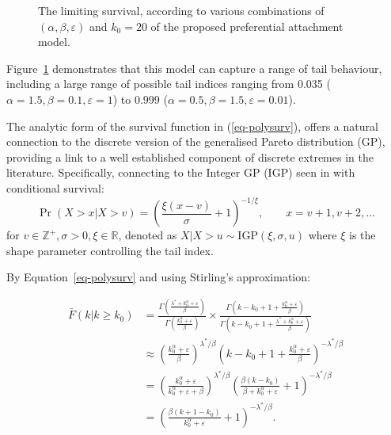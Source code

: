 \documentclass[
  sn-basic,
]{sn-jnl}
\theoremstyle{plain}
\theoremstyle{plain}
\theoremstyle{remark}
\begin{document}
\begin{figure}


\caption{\label{fig-polylinsurv}The limiting survival, according to
various combinations of \((\alpha, \beta, \varepsilon)\) and \(k_0=20\)
of the proposed preferential attachment model.}

\end{figure}%

Figure~\ref{fig-polylinsurv} demonstrates that this model can capture a
range of tail behaviour, including a large range of possible tail
indices ranging from 0.035 (\(\alpha=1.5, \beta=0.1, \varepsilon=1\)) to
0.999 (\(\alpha=0.5, \beta=1.5, \varepsilon=0.01\)).

The analytic form of the survival function in (\ref{eq-polysurv}),
offers a natural connection to the discrete version of the generalised
Pareto distribution (GP), providing a link to a well established
component of discrete extremes in the literature. Specifically,
connecting to the Integer GP (IGP) seen in \citet{Rohrbeck_2018} with
conditional survival: \[
\Pr(X> x|X> v) = \left(\frac{\xi(x-v)}{\sigma} + 1\right)^{-1/\xi},\qquad x=v+1,v+2,\ldots
\] for \(v\in\mathbb Z^+, \sigma>0,\xi\in \mathbb R\), denoted as
\(X|X>u \sim  \mathrm {IGP}(\xi, \sigma, u)\) where \(\xi\) is the shape
parameter controlling the tail index.

By Equation~\ref{eq-polysurv} and using Stirling's approximation:

\begin{align*}
\bar F(k|k\ge k_0) &= \frac{\Gamma\left(\frac{\lambda^* + k_0^\alpha + \varepsilon}{\beta}\right)}{\Gamma\left(\frac{k_0^\alpha + \varepsilon}{\beta}\right)}\times\frac{\Gamma\left(k-k_0  +1 + \frac{k_0^\alpha + \varepsilon}{\beta}\right)}{\Gamma\left(k-k_0  +1 + \frac{\lambda^*+ k_0^\alpha + \varepsilon}{\beta}\right)}\\
&\approx\left(\frac{k_0^\alpha+\varepsilon}{\beta}\right)^{\lambda^*/\beta}\left(k-k_0+1+\frac{k_0^\alpha + \varepsilon}{\beta}\right)^{-\lambda^*/\beta}\\
&=\left(\frac{k_0^\alpha+\varepsilon}{k_0^\alpha+\varepsilon + \beta}\right)^{\lambda^*/\beta}\left(\frac{\beta(k-k_0)}{\beta + k_0^\alpha+\varepsilon} + 1\right)^{-\lambda^*/\beta}\\
&=\left(\frac{\beta(k+1-k_0)}{k_0^{\alpha}+\varepsilon} + 1\right)^{-\lambda^{*}/\beta}.
\end{align*}
\end{document}
